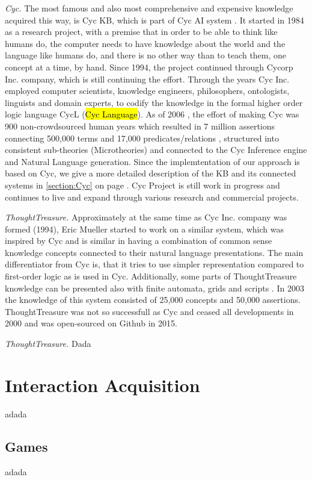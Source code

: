 \emph{Cyc.} The most famous and also most comprehensive and expensive knowledge acquired this way, is Cyc KB, which is part of Cyc AI system \parencite{Lenat1995}. It started in 1984 as a research project, with a premise that in order to be able to think like humans do, the computer needs to have knowledge about the world and the language like humans do, and there is no other way than to teach them, one concept at a time, by hand. Since 1994, the project continued through Cycorp Inc. company, which is still continuing the effort. Through the years Cyc Inc. employed computer scientists, knowledge engineers, philosophers, ontologists, linguists and domain experts, to codify the knowledge in the formal higher order logic language CycL (\hl{Cyc Language}). As of 2006   \parencite{Matuszek2006}, the effort of making Cyc was 900 non-crowdsourced human years which resulted in 7 million assertions connecting 500,000 terms and 17,000 predicates/relations \parencite{Zang2013}, structured into consistent sub-theories (Microtheories) and connected to the Cyc Inference engine and Natural Language generation. Since the implemtentation of our approach is based on Cyc, we give a more detailed description of the KB and its connected systems in \autoref{section:Cyc} on page \pageref{section:Cyc}. Cyc Project is still work in progress and continues to live and expand through various research and commercial projects.

\emph{ThoughtTreasure.} Approximately at the same time as Cyc Inc. company was formed (1994), Eric Mueller started to work on a similar system, which was inspired by Cyc and is similar in having a combination of common sense knowledge concepts connected to their natural language presentations. The main differentiator from Cyc is, that it tries to use simpler representation compared to first-order logic as is used in Cyc. Additionally, some parts of ThoughtTreasure knowledge can be presented also with finite automata, grids and scripts \parencite{Mueller1999,Mueller2003}. In 2003 the knowledge of this system consisted of 25,000 concepts and 50,000 assertions. ThoughtTreasure was not so successfull as Cyc and ceased all developments in 2000 and was open-sourced on Github in 2015.
 
\emph{ThoughtTreasure.} Dada
 
\section{Interaction Acquisition}
adada
\subsection{Games}
adada

